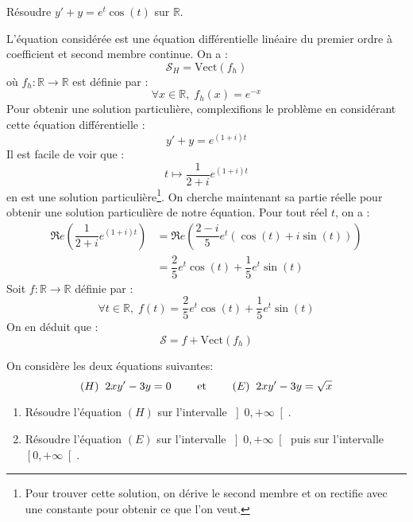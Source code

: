 \documentclass[a4paper,10pt]{report}
\begin{document}
\begin{Exercice}{} Résoudre $y'+y = e^t \cos(t)$ sur $\mathbb{R}$.
\end{Exercice}

\corr L'équation considérée est une équation différentielle linéaire du premier ordre à coefficient et second membre continue. On a :
$$ \mathcal{S}_H = \textrm{Vect}(f_h)$$
où $f_h : \mathbb{R} \rightarrow \mathbb{R}$ est définie par :
$$ \forall x \in \mathbb{R}, \; f_h(x) = e^{-x}$$
Pour obtenir une solution particulière, \og complexifions \fg{} le problème en considérant cette équation différentielle :
$$ y'+y = e^{(1+i)t}$$
Il est facile de voir que :
$$ t \mapsto \dfrac{1}{2+i} e^{(1+i)t}$$
en est une solution particulière\footnote{Pour trouver cette solution, on dérive le second membre et on rectifie avec une constante pour obtenir ce que l'on veut.}. On cherche maintenant sa partie réelle pour obtenir une solution particulière de notre équation. Pour tout réel $t$, on a :
\begin{align*}
\Re e \left(\dfrac{1}{2+i} e^{(1+i)t} \right) & = \Re e \left(\dfrac{2-i}{5} e^t (\cos(t) + i \sin(t)) \right) \\
& = \dfrac{2}{5} e^t \cos(t) + \dfrac{1}{5} e^t \sin(t) 
\end{align*}
Soit $f : \mathbb{R} \rightarrow \mathbb{R}$ définie par :
$$ \forall t \in \mathbb{R}, \; f(t) = \dfrac{2}{5} e^t \cos(t) + \dfrac{1}{5} e^t \sin(t) $$
On en déduit que :
$$ \mathcal{S} = f +  \textrm{Vect}(f_h)$$

\begin{Exercice}{} On considère les deux équations suivantes:\\
$$ (H) \; \;  2xy'-3y=0  \qquad \hbox{ et } \qquad (E) \; \; 2xy'-3y=\sqrt{x} $$

\begin{enumerate}
\item Résoudre l'équation $(H)$ sur l'intervalle $\left]  0,+\infty\right[ $.
\item Résoudre l'équation $(E)$ sur l'intervalle $\left]  0,+\infty\right[   $ puis sur l'intervalle $\left[ 0,+\infty\right[ $.
\end{enumerate}
\end{Exercice}
\end{document}
